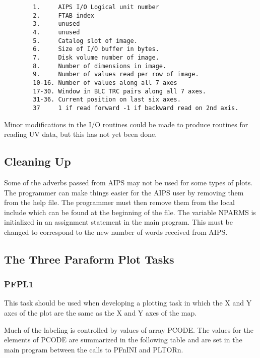 \begin{verbatim}
        1.     AIPS I/O Logical unit number
        2.     FTAB index
        3.     unused
        4.     unused
        5.     Catalog slot of image.
        6.     Size of I/O buffer in bytes.
        7.     Disk volume number of image.
        8.     Number of dimensions in image.
        9.     Number of values read per row of image.
        10-16. Number of values along all 7 axes
        17-30. Window in BLC TRC pairs along all 7 axes.
        31-36. Current position on last six axes.
        37     1 if read forward -1 if backward read on 2nd axis.
\end{verbatim}

Minor modifications in the I/O routines could be made to produce
routines for reading UV data, but this has not yet been done.

\subsection{Cleaning Up}
Some of the adverbs passed from AIPS may not be used for some types of
plots.  The programmer can make things easier for the AIPS user by
removing them from the help file.  The programmer must then remove
them from the local include which can be found at the beginning of the
file.  The variable NPARMS is initialized in an assignment statement
in the main program. This must be changed to correspond to the new
number of words received from AIPS.

\subsection{The Three Paraform Plot Tasks}
\subsubsection{PFPL1}
This task should be used when developing a plotting task in which the
X and Y axes of the plot are the same as the X and Y axes of the map.

Much of the labeling is controlled by values of array PCODE.  The
values for the elements of PCODE are summarized in the following table
and are set in the main program between the calls to PFnINI and
PLTORn.

